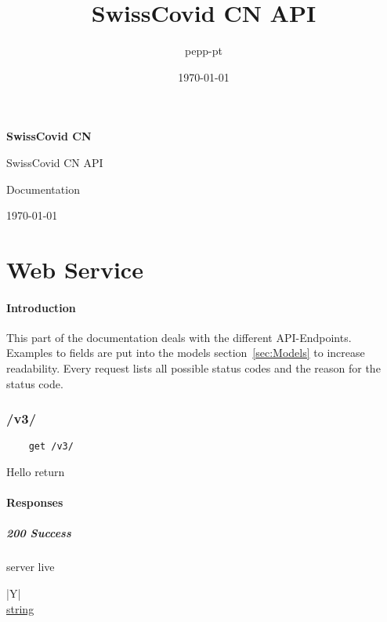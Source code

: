 \documentclass[a4paper
]{ubarticle}
\title{SwissCovid CN API}
\date{\today}
\author{pepp-pt}
\begin{document}
\begin{titlepage}
	\hspace{4.3cm}
 {\raggedleft
	 \textbf{SwissCovid CN} \\
\vspace{0.3cm}
	 
\par}
	\vspace{3cm}
	{\Huge SwissCovid CN API \par}
	\vspace{1.5cm}
	{\huge Documentation \par}
	\vspace{3cm}
	{ \large \today }
	\end{titlepage}
\thispagestyle{empty}
\clearpage
\tableofcontents
\clearpage
\part{Web Service}
\subsection{Introduction}
This part of the documentation deals with the different API-Endpoints. Examples to fields are put into the models section~\ref{sec:Models} to increase readability. Every request lists all possible status codes and the reason for the status code.
\section{ /v3/ }
    \begin{verbatim}
    get /v3/
    \end{verbatim}
Hello return

\subsection{Responses}
\subsubsection{ 200 Success }
server live
 

    
        \begin{ubresponses}{\textwidth}{|Y|}
        \\
        \hline
             \hyperref[sec:string] { string } \\
 \hline

        \end{ubresponses}
    
\end{document}
